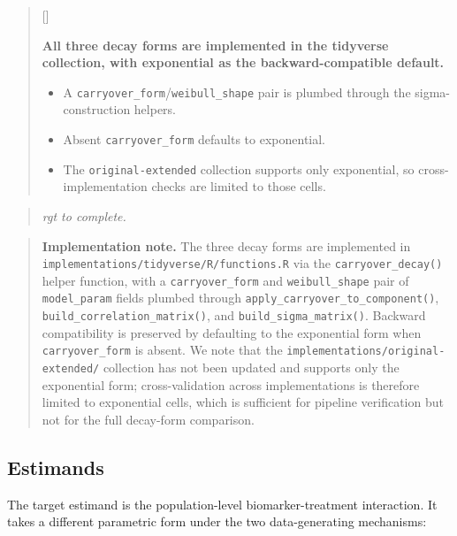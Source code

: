 \documentclass[
  11pt,
]{article}
\newcounter{pgraph}
\newenvironment{bullets}{%
  \stepcounter{pgraph}%
  \begin{quote}\small\sffamily\color[gray]{0.30}%
  {\normalfont\scriptsize\color[gray]{0.58}[\thepgraph]\enspace}}{%
  \end{quote}}
\newenvironment{rgt}{%
  \begin{quote}\small\itshape\color[RGB]{20,60,160}}{%
  \end{quote}}
\newenvironment{orig}{%
  \begin{quote}\normalsize\color[gray]{0.55}}{%
  \end{quote}}
\begin{document}
\begin{bullets}

\textbf{All three decay forms are implemented in the tidyverse
collection, with exponential as the backward-compatible default.}

\begin{itemize}\setlength{\itemsep}{2pt}\setlength{\parskip}{0pt}
\item A \texttt{carryover\_form}/\texttt{weibull\_shape} pair is
plumbed through the sigma-construction helpers.
\item Absent \texttt{carryover\_form} defaults to exponential.
\item The \texttt{original-extended} collection supports only
exponential, so cross-implementation checks are limited to those
cells.
\end{itemize}

\end{bullets}

\begin{rgt}
rgt to complete.

\end{rgt}

\begin{orig}
\textbf{Implementation note.} The three decay forms are implemented in
\texttt{implementations/tidyverse/R/functions.R} via the
\texttt{carryover\_decay()} helper function, with a \texttt{carryover\_form} and
\texttt{weibull\_shape} pair of \texttt{model\_param} fields plumbed through
\texttt{apply\_carryover\_to\_component()}, \texttt{build\_correlation\_matrix()},
and \texttt{build\_sigma\_matrix()}. Backward compatibility is preserved
by defaulting to the exponential form when \texttt{carryover\_form} is
absent. We note that the \texttt{implementations/original-extended/}
collection has not been updated and supports only the exponential
form; cross-validation across implementations is therefore
limited to exponential cells, which is sufficient for pipeline
verification but not for the full decay-form comparison.

\end{orig}

\subsection{Estimands}\label{estimands}

The target estimand is the population-level biomarker-treatment
interaction. It takes a different parametric form under the two
data-generating mechanisms:
\end{document}
